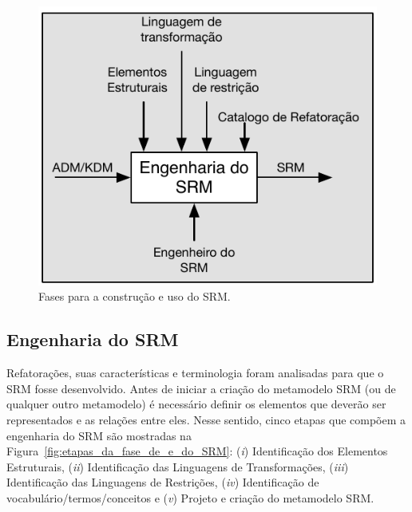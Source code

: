 \begin{figure}[h]
	\centering
	\caption{Fases para a construção e uso do SRM.}
	\label{fig:fases_para_a_construcao_e_uso_do_SRM}
	\includegraphics[scale=0.9]{images/SRM_Construcao2}
	\fautor
\end{figure}

\subsection{Engenharia do SRM}\label{Engenharia_do_Meta_modelo_SRM}

Refatorações, suas características e terminologia foram analisadas para que o SRM fosse desenvolvido. Antes de iniciar a criação do metamodelo SRM (ou de qualquer outro metamodelo) é necessário definir os elementos que deverão ser representados e as relações entre eles. Nesse sentido, cinco etapas que compõem a engenharia do SRM são mostradas na Figura~\ref{fig:etapas_da_fase_de_e_do_SRM}: (\textit{i}) Identificação dos Elementos Estruturais, (\textit{ii}) Identificação das Linguagens de Transformações, (\textit{iii}) Identificação das Linguagens de Restrições, (\textit{iv}) Identificação de vocabulário/termos/conceitos e (\textit{v}) Projeto e criação do metamodelo SRM. 

